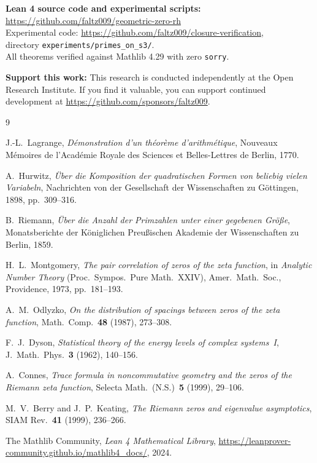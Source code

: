 \documentclass[12pt,a4paper]{article}
\theoremstyle{definition}
\theoremstyle{remark}
\begin{document}
\medskip
\noindent\textbf{Lean 4 source code and experimental scripts:}\\
\url{https://github.com/faltz009/geometric-zero-rh}\\
Experimental code: \url{https://github.com/faltz009/closure-verification},\\
directory \texttt{experiments/primes\_on\_s3/}.\\
All theorems verified against Mathlib 4.29 with zero \texttt{sorry}.

\medskip
\noindent\textbf{Support this work:}
This research is conducted independently at the Open Research Institute.
If you find it valuable, you can support continued development at
\url{https://github.com/sponsors/faltz009}.

\begin{thebibliography}{9}

J.-L.\ Lagrange,
\textit{D\'emonstration d'un th\'eor\`eme d'arithm\'etique},
Nouveaux M\'emoires de l'Acad\'emie Royale des Sciences et Belles-Lettres
de Berlin, 1770.

A.\ Hurwitz,
\textit{\"Uber die Komposition der quadratischen Formen von beliebig vielen
Variabeln},
Nachrichten von der Gesellschaft der Wissenschaften zu G\"ottingen,
1898, pp.\ 309--316.

B.\ Riemann,
\textit{\"Uber die Anzahl der Primzahlen unter einer gegebenen Gr\"o\ss e},
Monatsberichte der K\"oniglichen Preu\ss ischen Akademie der Wissenschaften
zu Berlin, 1859.

H.\ L.\ Montgomery,
\textit{The pair correlation of zeros of the zeta function},
in \textit{Analytic Number Theory} (Proc.\ Sympos.\ Pure Math.\ XXIV),
Amer.\ Math.\ Soc., Providence, 1973, pp.\ 181--193.

A.\ M.\ Odlyzko,
\textit{On the distribution of spacings between zeros of the zeta function},
Math.\ Comp.\ \textbf{48} (1987), 273--308.

F.\ J.\ Dyson,
\textit{Statistical theory of the energy levels of complex systems~I},
J.\ Math.\ Phys.\ \textbf{3} (1962), 140--156.

A.\ Connes,
\textit{Trace formula in noncommutative geometry and the zeros of the Riemann
zeta function},
Selecta Math.\ (N.S.)\ \textbf{5} (1999), 29--106.

M.\ V.\ Berry and J.\ P.\ Keating,
\textit{The Riemann zeros and eigenvalue asymptotics},
SIAM Rev.\ \textbf{41} (1999), 236--266.

The Mathlib Community,
\textit{Lean 4 Mathematical Library},
\url{https://leanprover-community.github.io/mathlib4_docs/}, 2024.

\end{thebibliography}
\end{document}
